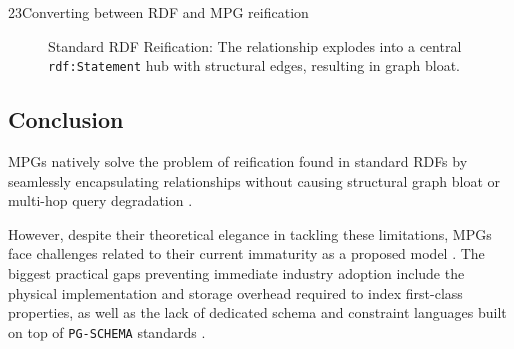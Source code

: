 \begin{question}{2}{3}{Converting between RDF and MPG reification}
\begin{figure}[htbp]
\caption{Standard RDF Reification: The relationship explodes into a central \texttt{rdf:Statement} hub with structural edges, resulting in graph bloat.}
\label{fig:rdf_reification}
\end{figure}

\subsection{Conclusion}

MPGs natively solve the problem of reification found in standard RDFs by seamlessly encapsulating relationships without causing structural graph bloat or multi-hop query degradation \cite{sadoughi_meta-property_2025, hernandez_reifying_nodate}. 

However, despite their theoretical elegance in tackling these limitations, MPGs face challenges related to their current immaturity as a proposed model \cite{sadoughi_meta-property_2025}. The biggest practical gaps preventing immediate industry adoption include the physical implementation and storage overhead required to index first-class properties, as well as the lack of dedicated schema and constraint languages built on top of \texttt{PG-SCHEMA} standards \cite{sadoughi_meta-property_2025}.

\end{question}
